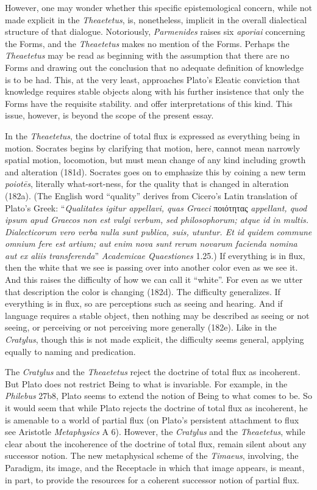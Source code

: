 However, one may wonder whether this specific epistemological concern, while not made explicit in the \emph{Theaetetus}, is, nonetheless, implicit in the overall dialectical structure of that dialogue. Notoriously, \emph{Parmenides} raises six \emph{aporiai} concerning the Forms, and the \emph{Theaetetus} makes no mention of the Forms. Perhaps the \emph{Theaetetus} may be read as beginning with the assumption that there are no Forms and drawing out the conclusion that no adequate definition of knowledge is to be had. This, at the very least, approaches Plato's Eleatic conviction that knowledge requires stable objects along with his further insistence that only the Forms have the requisite stability. \citet{Cornford:1951ei} and \citet{Kahn:2013ob} offer interpretations of this kind. This issue, however, is beyond the scope of the present essay.

In the \emph{Theaetetus}, the doctrine of total flux is expressed as everything being in motion. Socrates begins by clarifying that motion, here, cannot mean narrowly spatial motion, locomotion, but must mean change of any kind including growth and alteration (181d). Socrates goes on to emphasize this by coining a new term \emph{poiotēs}, literally what-sort-ness, for the quality that is changed in alteration (182a). (The English word ``quality'' derives from Cicero's Latin translation of Plato's Greek: ``\emph{Qualitates igitur appellavi, quas Graeci} {\sbl ποιότητας} \emph{appellant, quod ipsum apud Graecos non est vulgi verbum, sed philosophorum; atque id in multis. Dialecticorum vero verba nulla sunt publica, suis, utuntur. Et id quidem commune omnium fere est artium; aut enim nova sunt rerum novarum facienda nomina aut ex aliis transferenda}'' \emph{Academicae Quaestiones} 1.25.) If everything is in flux, then the white that we see is passing over into another color even as we see it. And this raises the difficulty of how we can call it ``white''. For even as we utter that description the color is changing (182d). The difficulty generalizes. If everything is in flux, so are perceptions such as seeing and hearing. And if language requires a stable object, then nothing may be described as seeing or not seeing, or perceiving or not perceiving more generally (182e). Like in the \emph{Cratylus}, though this is not made explicit, the difficulty seems general, applying equally to naming and predication.

The \emph{Cratylus} and the \emph{Theaetetus} reject the doctrine of total flux as incoherent. But Plato does not restrict Being to what is invariable. For example, in the \emph{Philebus} 27b8, Plato seems to extend the notion of Being to what comes to be. So it would seem that while Plato rejects the doctrine of total flux as incoherent, he is amenable to a world of partial flux (on Plato's persistent attachment to flux see Aristotle \emph{Metaphysics} A 6). However, the \emph{Cratylus} and the \emph{Theaetetus}, while clear about the incoherence of the doctrine of total flux, remain silent about any successor notion. The new metaphysical scheme of the \emph{Timaeus}, involving, the Paradigm, its image, and the Receptacle in which that image appears, is meant, in part, to provide the resources for a coherent successor notion of partial flux.

